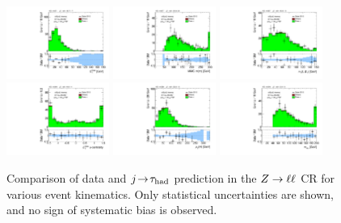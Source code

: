 \begin{figure}[tp]
  \includegraphics[width=0.30\textwidth]{figures/analysis/vbf-ZllCR/met-pt-hi}
  \includegraphics[width=0.30\textwidth]{figures/analysis/vbf-ZllCR/mMMC}
  \includegraphics[width=0.30\textwidth]{figures/analysis/vbf-ZllCR/mT-hi} \\
  \includegraphics[width=0.30\textwidth]{figures/analysis/vbf-ZllCR/met-phi-centrality}
  \includegraphics[width=0.30\textwidth]{figures/analysis/vbf-ZllCR/H-pt-hi}
  \includegraphics[width=0.30\textwidth]{figures/analysis/vbf-ZllCR/mvis} \\
  \caption{Comparison of data and $j\!\rightarrow\!\tau_\text{had}$ prediction in the $Z \rightarrow \ell\ell$ CR for various event kinematics. Only statistical uncertainties are shown, and no sign of systematic bias is observed.}
  \label{fig:backgrounds-ZllCR-taus}
\end{figure}

